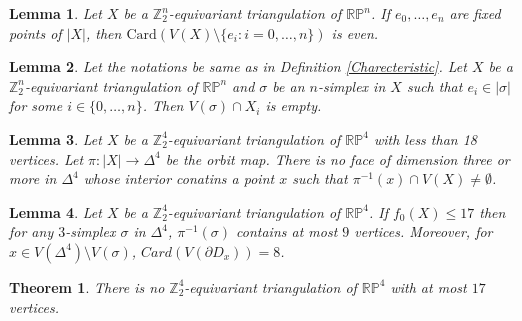 \documentclass[10pt,a4paper]{amsart}
\newtheorem{lemma}{Lemma}
\newtheorem{theorem}{Theorem}
\newcommand{\D}{\Delta}
\newcommand{\RP}{\mathbb{RP}}
\def \ZZ{{\bb{Z}}}
\def \bb{\mathbb}
\begin{document}
\begin{lemma}\label{lem1}
Let $X$ be a $\ZZ_2^n$-equivariant triangulation of $\mathbb{RP}^{n}$. If $e_0, \ldots, e_{n}$ are fixed points of $|X|$, then $\mathrm{Card}(V(X)\setminus \{e_i : i=0, \ldots, n\})$ is even. 
\end{lemma}

\begin{lemma}\label{lem4}
Let the notations be same as in Definition 
\ref{Charecteristic}. Let $X$ be a $\ZZ_2^n$-equivariant triangulation of $\mathbb{RP}^n$ and $\sigma$ be an $n$-simplex
in $X$ such that $e_i \in |\sigma|$ for some $i \in \{0, \ldots, n\}$. Then $V(\sigma) \cap
X_i$ is empty.
\end{lemma}

\begin{lemma}\label{lem:nointerior}
   Let $X$ be a $\ZZ_2^4$-equivariant triangulation of $\RP^4$ with less than 18 vertices. Let $\pi:|X|\rightarrow \D^4$ be the orbit map. There is no face of dimension three or more in $\D^4$ whose interior conatins a point $x$ such that $\pi^{-1}(x) \cap V(X) \neq \emptyset$. 
\end{lemma}

\begin{lemma}\label{atmost9}
Let $X$ be a $\ZZ_2^4$-equivariant triangulation of $\RP^4$.  If $f_0(X)\leq 17$ then for any $3$-simplex $\sigma$ in $\D^4$, $\pi^{-1}(\sigma)$ contains at most $9$ vertices. Moreover, for $x\in V(\D^4)\setminus V(\sigma)$, $Card(V(\partial D_x))=8$. 
\end{lemma}

\begin{theorem}\label{thm7}
 There is no $\ZZ_2^4$-equivariant triangulation of $\mathbb{RP}^4$ with at most $17$ vertices.
\end{theorem}
\end{document}
